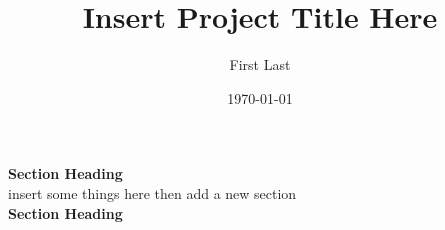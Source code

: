 \documentclass[12pt,a4paper,man,natbib]{apa6}
\title{\large{Insert Project Title Here}}
\author{First Last}
\affiliation{WhoYoureWith}
\date{\today}
\begin{document}
\maketitle
\textbf{Section Heading}\\ 
insert some things here then add a new section\\ 
\textbf{Section Heading}\\ 
\end{document}
